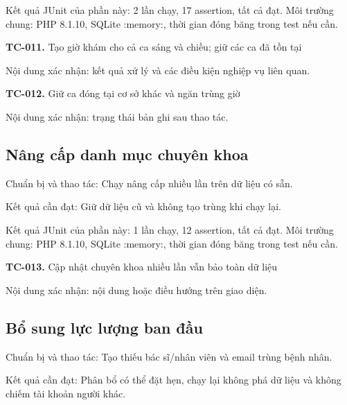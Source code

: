 Kết quả JUnit của phần này:\allowbreak{} 2 lần chạy, 17 assertion, tất cả đạt.\allowbreak{} Môi trường chung:\allowbreak{} PHP 8.\allowbreak{}1.\allowbreak{}10, SQLite :\allowbreak{}memory:\allowbreak{}, thời gian đóng băng trong test nếu cần.\allowbreak{}

\noindent\textbf{TC-011.} Tạo giờ khám cho cả ca sáng và chiều; giữ các ca đã tồn tại\par
Nội dung xác nhận:\allowbreak{} kết quả xử lý và các điều kiện nghiệp vụ liên quan.\allowbreak{}

\noindent\textbf{TC-012.} Giữ ca đóng tại cơ sở khác và ngăn trùng giờ\par
Nội dung xác nhận:\allowbreak{} trạng thái bản ghi sau thao tác.\allowbreak{}


\par\vspace{8pt}

\subsection{Nâng cấp danh mục chuyên khoa}
Chuẩn bị và thao tác:\allowbreak{} Chạy nâng cấp nhiều lần trên dữ liệu có sẵn.\allowbreak{}

Kết quả cần đạt:\allowbreak{} Giữ dữ liệu cũ và không tạo trùng khi chạy lại.\allowbreak{}

Kết quả JUnit của phần này:\allowbreak{} 1 lần chạy, 12 assertion, tất cả đạt.\allowbreak{} Môi trường chung:\allowbreak{} PHP 8.\allowbreak{}1.\allowbreak{}10, SQLite :\allowbreak{}memory:\allowbreak{}, thời gian đóng băng trong test nếu cần.\allowbreak{}

\noindent\textbf{TC-013.} Cập nhật chuyên khoa nhiều lần vẫn bảo toàn dữ liệu\par
Nội dung xác nhận:\allowbreak{} nội dung hoặc điều hướng trên giao diện.\allowbreak{}


\par\vspace{8pt}

\subsection{Bổ sung lực lượng ban đầu}
Chuẩn bị và thao tác:\allowbreak{} Tạo thiếu bác sĩ/\allowbreak{}nhân viên và email trùng bệnh nhân.\allowbreak{}

Kết quả cần đạt:\allowbreak{} Phân bổ có thể đặt hẹn, chạy lại không phá dữ liệu và không chiếm tài khoản người khác.\allowbreak{}


